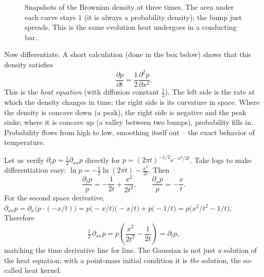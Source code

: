 \begin{figure}[H]
\centering
{}
\caption{Snapshots of the Brownian density at three times. The area under each
curve stays $1$ (it is always a probability density); the bump just spreads. This
is the same evolution heat undergoes in a conducting bar.}
\label{ch29:fig-heat}
\end{figure}

Now differentiate. A short calculation (done in the box below) shows that this
density satisfies
\[
  \boxed{\;\frac{\partial p}{\partial t} = \frac{1}{2}\frac{\partial^2 p}{\partial x^2}.\;}
\]
This is the \emph{heat equation} (with diffusion constant $\tfrac12$). The
left side is the rate at which the density changes in time; the right side is its
curvature in space. Where the density is concave down (a peak), the right side is
negative and the peak sinks; where it is concave up (a valley between two bumps),
probability fills in. Probability flows from high to low, smoothing itself out --
the exact behavior of temperature.

\begin{whybox}
Let us verify $\partial_t p = \tfrac12 \partial_{xx} p$ directly for
$p = (2\pi t)^{-1/2}e^{-x^2/2t}$. Take logs to make differentiation easy:
$\ln p = -\tfrac12\ln(2\pi t) - \tfrac{x^2}{2t}.$ Then
\[
  \frac{\partial_t p}{p} = -\frac{1}{2t} + \frac{x^2}{2t^2},
  \qquad
  \frac{\partial_x p}{p} = -\frac{x}{t}.
\]
For the second space derivative,
$\partial_{xx} p = \partial_x\!\big(p\cdot(-x/t)\big)
= p\big(-x/t\big)\big(-x/t\big) + p\big(-1/t\big)
= p\big(x^2/t^2 - 1/t\big).$ Therefore
\[
  \tfrac12\,\partial_{xx} p = p\left(\frac{x^2}{2t^2}-\frac{1}{2t}\right)
  = \partial_t p,
\]
matching the time derivative line for line. The Gaussian is not just \emph{a}
solution of the heat equation; with a point-mass initial condition it is \emph{the}
solution, the so-called heat kernel.
\end{whybox}

